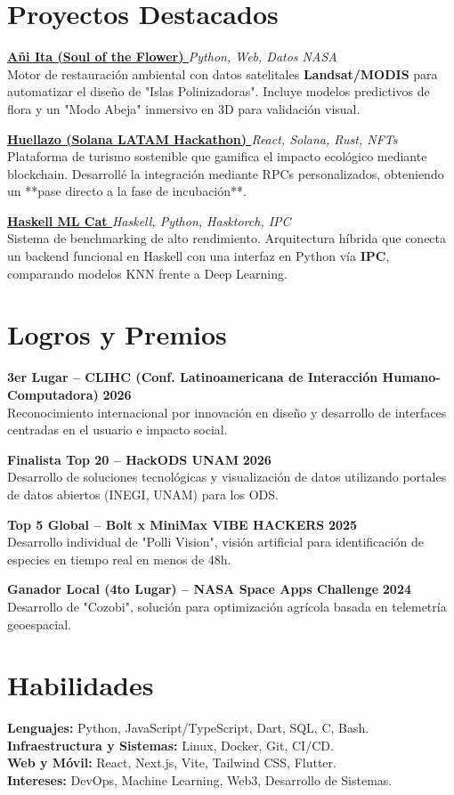 \documentclass[a4paper,11pt]{article}
\newcommand{\project}[3]{
  \vspace{1pt}
  {\bfseries #1} \hfill \textit{\footnotesize #2} \\
  {\small #3} \par
  \vspace{2pt}
}
\newcommand{\award}[3]{
  \vspace{1pt}
  {\bfseries #1} \hfill \textbf{\footnotesize #2} \\
  {\small #3} \par
  \vspace{1pt}
}
\begin{document}
\section*{Proyectos Destacados}

\project{\href{https://github.com/p3p3p3k4z/a-u-ita}{Añi Ita (Soul of the Flower) \faGithub}}{Python, Web, Datos NASA}{
Motor de restauración ambiental con datos satelitales \textbf{Landsat/MODIS} para automatizar el diseño de "Islas Polinizadoras". Incluye modelos predictivos de flora y un "Modo Abeja" inmersivo en 3D para validación visual.}

\project{\href{https://github.com/p3p3p3k4z/huellazo-solana}{Huellazo (Solana LATAM Hackathon) \faGithub}}{React, Solana, Rust, NFTs}{
Plataforma de turismo sostenible que gamifica el impacto ecológico mediante blockchain. Desarrollé la integración mediante RPCs personalizados, obteniendo un **pase directo a la fase de incubación**.}

\project{\href{https://github.com/p3p3p3k4z/Haskell-ML-Cat}{Haskell ML Cat \faGithub}}{Haskell, Python, Hasktorch, IPC}{
Sistema de benchmarking de alto rendimiento. Arquitectura híbrida que conecta un backend funcional en Haskell con una interfaz en Python vía \textbf{IPC}, comparando modelos KNN frente a Deep Learning.}



\section*{Logros y Premios}

\award{3er Lugar -- CLIHC (Conf. Latinoamericana de Interacción Humano-Computadora)}{2026}{
Reconocimiento internacional por innovación en diseño y desarrollo de interfaces centradas en el usuario e impacto social.}

\award{Finalista Top 20 -- HackODS UNAM}{2026}{
Desarrollo de soluciones tecnológicas y visualización de datos utilizando portales de datos abiertos (INEGI, UNAM) para los ODS.}

\award{Top 5 Global -- Bolt x MiniMax VIBE HACKERS}{2025}{
Desarrollo individual de "Polli Vision", visión artificial para identificación de especies en tiempo real en menos de 48h.}

\award{Ganador Local (4to Lugar) -- NASA Space Apps Challenge}{2024}{
Desarrollo de "Cozobi", solución para optimización agrícola basada en telemetría geoespacial.}

\section*{Habilidades}
\small
\textbf{Lenguajes:} Python, JavaScript/TypeScript, Dart, SQL, C, Bash. \\
\textbf{Infraestructura y Sistemas:} Linux, Docker, Git, CI/CD. \\
\textbf{Web y Móvil:} React, Next.js, Vite, Tailwind CSS, Flutter. \\
\textbf{Intereses:} DevOps, Machine Learning, Web3, Desarrollo de Sistemas.
\end{document}
